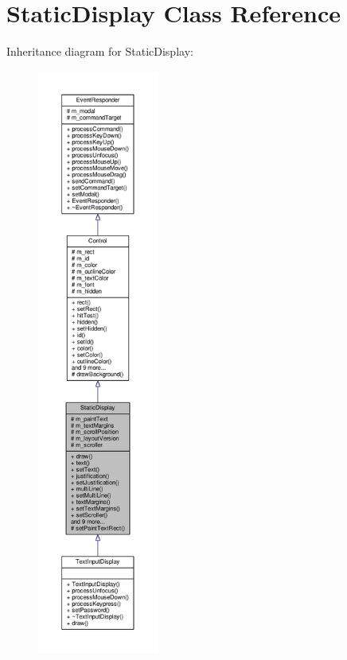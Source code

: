 \hypertarget{classStaticDisplay}{}\section{Static\+Display Class Reference}
\label{classStaticDisplay}


Inheritance diagram for Static\+Display\+:
\nopagebreak
\begin{figure}[H]
\begin{center}
\leavevmode
\includegraphics[height=550pt]{d2/d71/classStaticDisplay__inherit__graph}
\end{center}
\end{figure}


